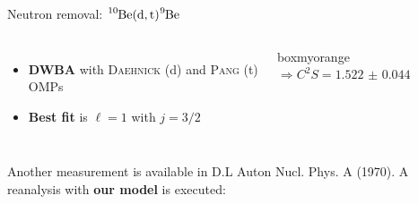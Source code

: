 \documentclass[sans,
frameno, %
mp,
usenames,dvipsnames, %
onlytextwidth, %
t,%
11pt]{beamer}
\newcommand{\iso}[2]{\ce{^{#1}#2}}
\begin{document}
\begin{frame}{Neutron removal: $\iso{10}{Be}(\textrm{d}, \textrm{t})\iso{9}{Be}$}
{\begin{figure}
\begin{minipage}[t]{0.48\linewidth}
            \end{minipage}
        \end{figure}
        \medskip
        \begin{columns}[c]
            {
                \begin{itemize}
                    \item \textbf{DWBA} with \textsc{Daehnick} (d) and \textsc{Pang} (t) OMPs
                    \item \textbf{Best fit} is $\ell = 1$ with $j = 3/2$
                \end{itemize}
            }\hfill
            {

                \begin{beamercolorbox}[sep=1ex, center, rounded=true]{boxmyorange}
                    $\Rightarrow C^2S = \qty{1.522(44)}{}$
                \end{beamercolorbox}

            }
        \end{columns}

    }
    \only<+>
    {
        \addtocounter{framenumber}{1}
        Another measurement is available in {\small D.L Auton Nucl. Phys. A (1970)}. A reanalysis with \textbf{our model} is executed:

}
\end{frame}
\end{document}
